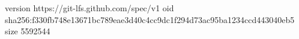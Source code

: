 version https://git-lfs.github.com/spec/v1
oid sha256:f330fb748e13671bc789eae3d40c4cc9dc1f294d73ac95ba1234ccd443040eb5
size 5592544
